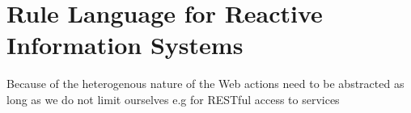 
\section{Rule Language for Reactive Information Systems}
Because of the heterogenous nature of the Web actions need to be abstracted
as long as we do not limit ourselves e.g for RESTful access to services


